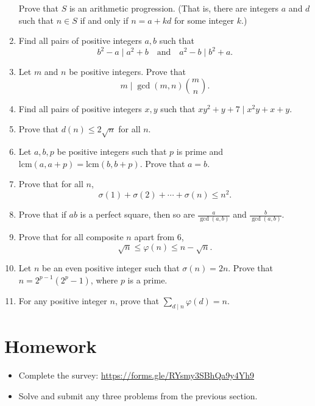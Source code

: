 \documentclass{article}
\newcommand\lcm{\mathrm{lcm}}
\begin{document}
\begin{enumerate}
    Prove that $S$ is an arithmetic
    progression. (That is, there are integers $a$ and $d$ such that $n\in S$ if
    and only if 
    $n=a+kd$ for some integer $k$.)
  \item Find all pairs of positive integers $a,b$ such that \[b^2-a\mid
      a^2+b\quad\text{and}\quad a^2-b\mid b^2+a.\]
  \item Let $m$ and $n$ be positive integers. Prove that
    \[m\mid\gcd(m,n)\binom mn.\]
  \item Find all pairs of positive integers $x,y$ such that $xy^2+y+7\mid
    x^2y+x+y$.
  \item Prove that $d(n)\le 2\sqrt n$ for all $n$.
  \item Let $a,b,p$ be positive integers such that $p$ is prime and
    $\lcm(a,a+p)=\lcm(b,b+p)$. Prove that $a=b$.
  \item Prove that for all $n$,
    \[\sigma(1)+\sigma(2)+\cdots+\sigma(n)\le n^2.\]
  \item Prove that if $ab$ is a perfect square, then so are $\frac a{\gcd(a,b)}$ and
      $\frac b{\gcd(a,b)}$.
  \item Prove that for all composite $n$ apart from 6,
    \[\sqrt n\le\varphi(n)\le n-\sqrt n.\]
  \item Let $n$ be an even positive integer such that $\sigma(n)=2n$. Prove that
    $n=2^{p-1}\left(2^p-1\right)$, where $p$ is a prime.
  \item For any positive integer $n$, prove that $\displaystyle\sum_{d\mid
    n}\varphi(d)=n$.
\end{enumerate}
\section{Homework}
\begin{itemize}
  \item Complete the survey:
    \href{https://forms.gle/RYsmy3SBhQa9y4Yh9}{https://forms.gle/RYsmy3SBhQa9y4Yh9}
  \item Solve and submit any three problems from the previous section.
\end{itemize} 
\end{document}
